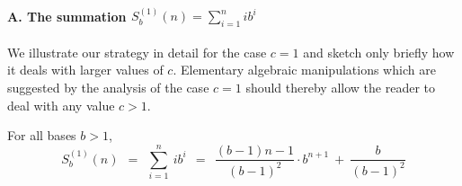 \medskip

\paragraph{A. The summation $S^{(1)}_b(n) = \sum_{i=1}^n i b^i$}

We illustrate our strategy in detail for the case $c=1$ and sketch only briefly how it deals with larger values of $c$.  Elementary algebraic manipulations which are suggested by the analysis of the case $c=1$ should thereby allow the reader to deal with any value $c > 1$.

\begin{prop}
\label{thm:sum-i2i}
For all bases $b > 1$,
\begin{equation}
\label{eq:sum-i2i}
S_b^{(1)}(n) \ \ = \ \
\sum_{i=1}^n \ i b^i
\ \ = \ \ 
\frac{(b-1)n -1}{(b-1)^2} \cdot  b^{n+1} \ + \ \frac{b}{(b-1)^2}
\end{equation}
\end{prop}

